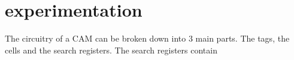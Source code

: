 \section{experimentation}
The circuitry of a CAM can be broken down into 3 main parts. The tags, the cells and the search registers. 
The search registers contain